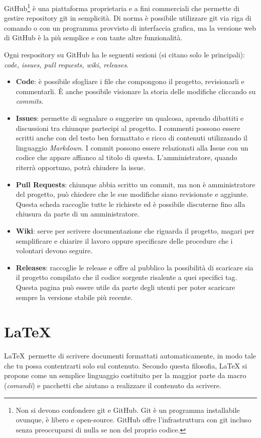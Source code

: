 \documentclass[a4paper,9pt]{extarticle}
\begin{document}
\begin{multicols*}{2}
GitHub\footnote{Non si devono confondere git e GitHub. Git è un programma installabile ovunque, è libero e open-source. GitHub offre l'infrastruttura con git incluso senza preoccuparsi di nulla se non del proprio codice.} è una piattaforma proprietaria e a fini commerciali che permette di gestire repository git in semplicità. Di norma è possibile utilizzare git via riga di comando o con un programma provvisto di interfaccia grafica, ma la versione web di GitHub è la più semplice e con tante altre funzionalità.

Ogni respository su GitHub ha le seguenti sezioni (si citano solo le principali): \textit{code, issues, pull requests, wiki, releases}.
\begin{itemize}
    \item \textbf{Code}: è possibile sfogliare i file che compongono il progetto, revisionarli e commentarli. È anche possibile visionare la storia delle modifiche cliccando su \textit{commits}.
    \item \textbf{Issues}: permette di segnalare o suggerire un qualcosa, aprendo dibattiti e discussioni tra chiunque partecipi al progetto. I commenti possono essere scritti anche con del testo ben formattato e ricco di contenuti utilizzando il linguaggio \textit{Markdown}. I commit possono essere relazionati alla Issue con un codice che appare affianco al titolo di questa. L'amministratore, quando riterrà opportuno, potrà chiudere la issue.
    \item \textbf{Pull Requests}: chiunque abbia scritto un commit, ma non è amministratore del progetto, può chiedere che le sue modifiche siano revisionate e aggiunte. Questa scheda raccoglie tutte le richieste ed è possibile discuterne fino alla chiusura da parte di un amministratore.
    \item \textbf{Wiki}: serve per scrivere documentazione che riguarda il progetto, magari per semplificare e chiarire il lavoro oppure specificare delle procedure che i volontari devono seguire.
    \item \textbf{Releases}: raccoglie le release e offre al pubblico la possibilità di scaricare sia il progetto compilato che il codice sorgente risalente a quei specifici tag. Questa pagina può essere utile da parte degli utenti per poter scaricare sempre la versione stabile più recente.
\end{itemize}

\section{\LaTeX}
\LaTeX\ permette di scrivere documenti formattati automaticamente, in modo tale che tu possa contentrarti solo sul contenuto. Secondo questa filosofia, LaTeX si propone come un semplice linguaggio costituito per la maggior parte da macro (\textit{comandi}) e pacchetti che aiutano a realizzare il contenuto da scrivere.


\end{multicols*}
\end{document}
